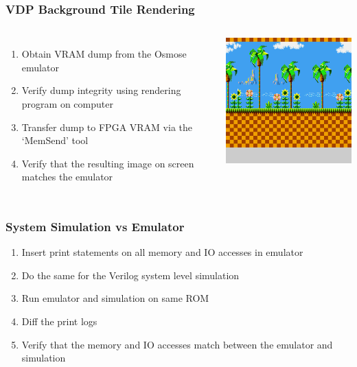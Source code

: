 \documentclass[xcolor=table]{beamer}
\newlength{\wideitemsep}
\let\olditem\item
\renewcommand{\item}{\setlength{\itemsep}{\wideitemsep}\olditem}
\begin{document}
\begin{frame}
    \frametitle{VDP Background Tile Rendering}
    \begin{columns}[c]
        \begin{enumerate}
            \item Obtain VRAM dump from the Osmose emulator
            \item Verify dump integrity using rendering program on computer
            \item Transfer dump to FPGA VRAM via the `MemSend' tool
            \item Verify that the resulting image on screen matches the emulator
        \end{enumerate}
        \includegraphics[width=\textwidth]{../images/screen.png}
    \end{columns}
\end{frame}

\begin{frame}
    \frametitle{System Simulation vs Emulator}
    \begin{enumerate}
        \item Insert print statements on all memory and IO accesses in emulator
        \item Do the same for the Verilog system level simulation
        \item Run emulator and simulation on same ROM
        \item Diff the print logs
        \item Verify that the memory and IO accesses match between the emulator
            and simulation
    \end{enumerate}
\end{frame}
\end{document}
